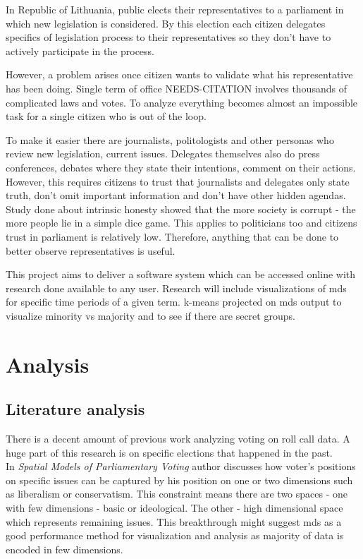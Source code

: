 \documentclass[a4paper,12pt]{article}
\begin{document}
    In Republic of Lithuania, public elects their representatives to a parliament in which new legislation is considered. By this election each citizen delegates specifics of legislation process to their representatives so they don't have to actively participate in the process.
	
	However, a problem arises once citizen wants to validate what his representative has been doing. Single term of office NEEDS-CITATION involves thousands of complicated laws and votes. To analyze everything becomes almost an impossible task for a single citizen who is out of the loop. 
	
	To make it easier there are journalists, politologists and other personas who review new legislation, current issues. Delegates themselves also do press conferences, debates where they state their intentions, comment on their actions. However, this requires citizens to trust that journalists and delegates only state truth, don't omit important information and don't have other hidden agendas. Study done about intrinsic honesty showed that the more society is corrupt - the more people lie in a simple dice game. This applies to politicians too and citizens trust in parliament is relatively low.  Therefore, anything that can be done to better observe representatives is useful.

	This project aims to deliver a software system which can be accessed online with research done available to any user. Research will include visualizations of \acrfull{mds} for specific time periods of a given term. \Gls{k-means} projected on \gls{mds} output to visualize minority vs majority and to see if there are secret groups.
    
    \clearpage
    
    \section{Analysis}
   
   	\subsection{Literature analysis}
   	
	There is a decent amount of previous work analyzing voting on roll call data. A huge part of this research is on specific elections that happened in the past.\\	
	
	In \textit{Spatial Models of Parliamentary Voting} \cite{poole_2005} author discusses how voter's positions on specific issues can be captured by his position on one or two dimensions such as liberalism or conservatism. This constraint means there are two spaces - one with few dimensions - basic  or ideological. The other - high dimensional space which represents remaining issues. This breakthrough might suggest \acrlong{mds} as a good performance method for visualization and analysis as majority of data is encoded in few dimensions.\\
	
\end{document}
